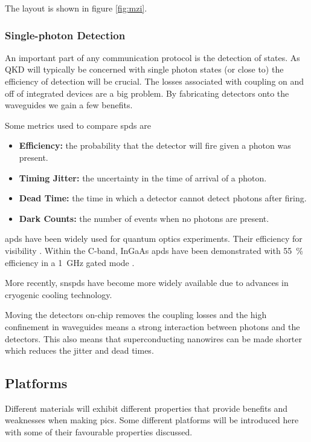 The layout is shown in figure \ref{fig:mzi}.

\subsubsection*{Single-photon Detection}

An important part of any communication protocol is the detection of states. As \ac{QKD} will typically be concerned with single photon states (or close to) the efficiency of detection will be crucial. The losses associated with coupling on and off of integrated devices are a big problem. By fabricating detectors onto the waveguides we gain a few benefits.

Some metrics used to compare \acp{spd} are

\begin{itemize}
	\item \textbf{Efficiency:} the probability that the detector will fire given a photon was present.
	\item \textbf{Timing Jitter:} the uncertainty in the time of arrival of a photon.
	\item \textbf{Dead Time:} the time in which a detector cannot detect photons after firing.
	\item \textbf{Dark Counts:} the number of events when no photons are present.
\end{itemize}

\Acp{apd} have been widely used for quantum optics experiments. Their efficiency for visibility . Within the C-band, InGaAs \acp{apd} have been demonstrated with \SI{55}{\percent} efficiency in a \SI{1}{GHz} gated mode \cite{comandar2015gigahertz}. 

More recently, \acp{snspd} have become more widely available due to advances in cryogenic cooling technology. 

Moving the detectors on-chip removes the coupling losses and the high confinement in waveguides means a strong interaction between photons and the detectors. This also means that superconducting nanowires can be made shorter which reduces the jitter and dead times.

\subsection{Platforms}

Different materials will exhibit different properties that provide benefits and weaknesses when making \acp{pic}. Some different platforms will be introduced here with some of their favourable properties discussed.

